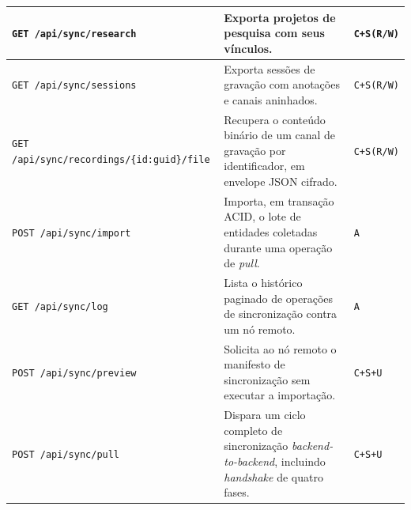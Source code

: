 \begin{longtable}{|p{}|p{}|p{}|}
\texttt{GET /api/sync/research} & Exporta projetos de pesquisa com seus vínculos. & \texttt{C+S(R/W)} \\ \hline
\texttt{GET /api/sync/sessions} & Exporta sessões de gravação com anotações e canais aninhados. & \texttt{C+S(R/W)} \\ \hline
\texttt{GET /api/sync/recordings/\newline \{id:guid\}/file} & Recupera o conteúdo binário de um canal de gravação por identificador, em envelope JSON cifrado. & \texttt{C+S(R/W)} \\ \hline
\texttt{POST /api/sync/import} & Importa, em transação ACID, o lote de entidades coletadas durante uma operação de \textit{pull}. & \texttt{A} \\ \hline
\texttt{GET /api/sync/log} & Lista o histórico paginado de operações de sincronização contra um nó remoto. & \texttt{A} \\ \hline
\texttt{POST /api/sync/preview} & Solicita ao nó remoto o manifesto de sincronização sem executar a importação. & \texttt{C+S+U} \\ \hline
\texttt{POST /api/sync/pull} & Dispara um ciclo completo de sincronização \textit{backend-to-backend}, incluindo \textit{handshake} de quatro fases. & \texttt{C+S+U} \\ \hline
\end{longtable}

